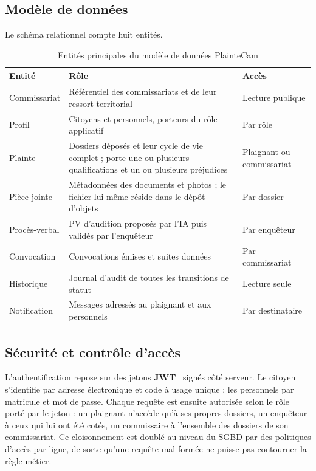 \subsection{Modèle de données}

Le schéma relationnel compte huit entités.

\begin{table}[H]
\centering
\begin{tabularx}{\linewidth}{|l|X|l|}
\hline
\textbf{Entité}       & \textbf{Rôle}                                                     & \textbf{Accès} \\
\hline
Commissariat          & Référentiel des commissariats et de leur ressort territorial      & Lecture publique \\
\hline
Profil                & Citoyens et personnels, porteurs du rôle applicatif               & Par rôle \\
\hline
Plainte               & Dossiers déposés et leur cycle de vie complet ; porte une ou plusieurs qualifications et un ou plusieurs préjudices & Plaignant ou commissariat \\
\hline
Pièce jointe          & Métadonnées des documents et photos ; le fichier lui-même réside dans le dépôt d'objets & Par dossier \\
\hline
Procès-verbal         & PV d'audition proposés par l'IA puis validés par l'enquêteur      & Par enquêteur \\
\hline
Convocation           & Convocations émises et suites données                             & Par commissariat \\
\hline
Historique            & Journal d'audit de toutes les transitions de statut               & Lecture seule \\
\hline
Notification          & Messages adressés au plaignant et aux personnels                  & Par destinataire \\
\hline
\end{tabularx}
\caption{Entités principales du modèle de données PlainteCam}
\label{tab:entites}
\end{table}

\subsection{Sécurité et contrôle d'accès}

L'authentification repose sur des jetons \textbf{JWT}~\cite{jwt:rfc} signés côté serveur. Le citoyen s'identifie par adresse électronique et code à usage unique ; les personnels par matricule et mot de passe. Chaque requête est ensuite autorisée selon le rôle porté par le jeton : un plaignant n'accède qu'à ses propres dossiers, un enquêteur à ceux qui lui ont été cotés, un commissaire à l'ensemble des dossiers de son commissariat. Ce cloisonnement est doublé au niveau du SGBD par des politiques d'accès par ligne, de sorte qu'une requête mal formée ne puisse pas contourner la règle métier.

